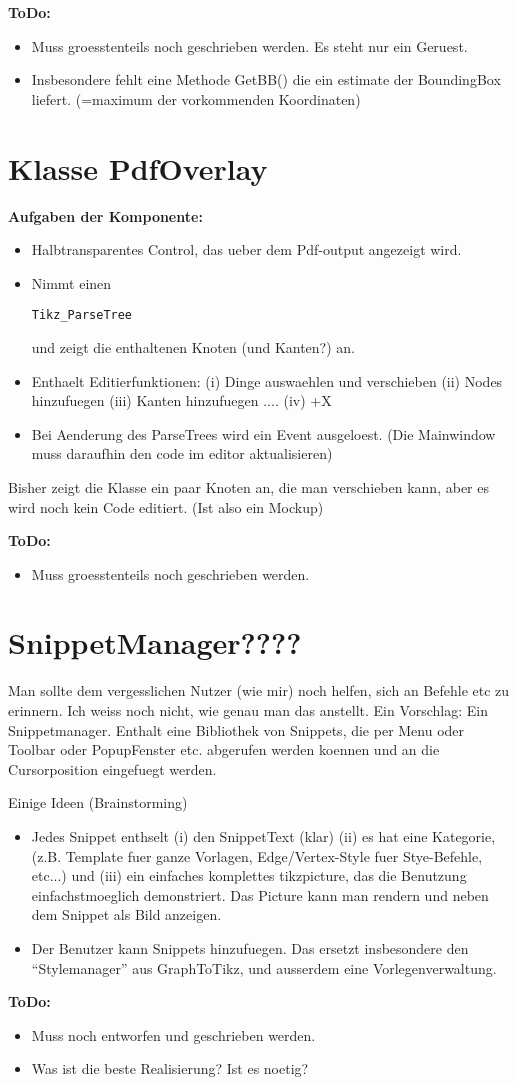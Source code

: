 \documentclass{article}
\begin{document}
      {\bf  ToDo:}
\begin{itemize}
       \item Muss groesstenteils noch geschrieben werden. Es steht nur ein Geruest.
        \item Insbesondere fehlt eine Methode GetBB() die ein estimate der BoundingBox liefert. (=maximum der vorkommenden Koordinaten)
\end{itemize}

\section{Klasse PdfOverlay}
 
    {\bf Aufgaben der Komponente:}
\begin{itemize}
    \item Halbtransparentes Control, das ueber dem Pdf-output angezeigt wird. 
\item Nimmt einen \begin{verbatim}Tikz_ParseTree\end{verbatim} und zeigt die enthaltenen Knoten (und Kanten?) an.
\item Enthaelt Editierfunktionen: (i) Dinge auswaehlen und verschieben (ii) Nodes hinzufuegen (iii) Kanten hinzufuegen  .... (iv) +X
\item Bei Aenderung des ParseTrees wird ein Event ausgeloest. (Die Mainwindow muss daraufhin den code im editor aktualisieren)
\end{itemize}

Bisher zeigt die Klasse ein paar Knoten an, die man verschieben kann, aber es wird noch kein Code editiert. (Ist also ein Mockup)

      {\bf  ToDo:}
\begin{itemize}
       \item Muss groesstenteils noch geschrieben werden. 
\end{itemize}

\section{SnippetManager????}
Man sollte dem vergesslichen Nutzer (wie mir) noch helfen, sich an Befehle etc zu erinnern.
Ich weiss noch nicht, wie genau man das anstellt. Ein Vorschlag: Ein Snippetmanager.
Enthalt eine Bibliothek von Snippets, die per Menu oder Toolbar oder PopupFenster etc. abgerufen werden koennen und an die Cursorposition eingefuegt werden.

Einige Ideen (Brainstorming)
\begin{itemize}
\item Jedes Snippet enthselt (i) den SnippetText (klar) (ii) es hat eine Kategorie, (z.B. Template fuer ganze Vorlagen, Edge/Vertex-Style fuer Stye-Befehle, etc...) und (iii) ein einfaches komplettes tikzpicture, das die Benutzung einfachstmoeglich demonstriert. Das Picture kann man rendern und neben dem Snippet als Bild anzeigen.
\item Der Benutzer kann Snippets hinzufuegen. Das ersetzt insbesondere den ``Stylemanager'' aus GraphToTikz, und ausserdem eine Vorlegenverwaltung.
\end{itemize}

      {\bf  ToDo:}
\begin{itemize}
       \item Muss noch entworfen und geschrieben werden.
\item Was ist die beste Realisierung? Ist es noetig?
\end{itemize}
\end{document}
